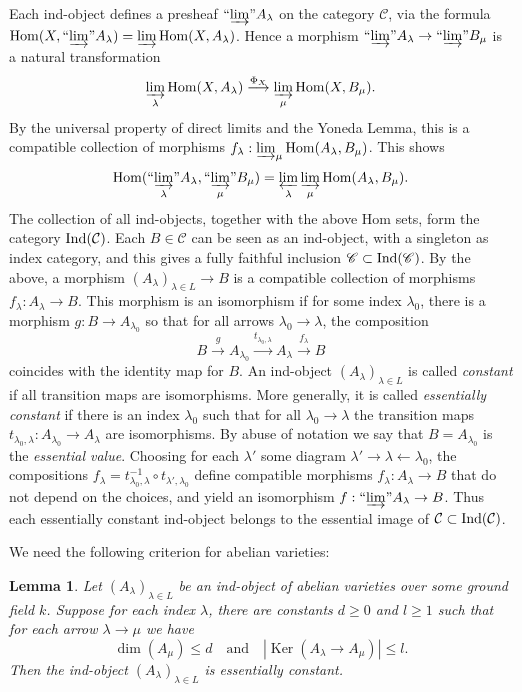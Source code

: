 \documentclass[oneside, 12pt]{amsart}
\newcommand\mylabel[1]{\label{#1}\marginpar{\vspace{-1ex}\medskip\medskip\footnotesize \tt #1}}
\renewcommand\mylabel[1]{\label{#1}}
\newtheorem{lemma}[theorem]{Lemma}
\theoremstyle{definition}
\theoremstyle{remark}
\newcommand{\shC}{\mathscr{C}}
\newcommand{\catC}{\mathcal{C}}
\newcommand{\Hom}{\operatorname{Hom}}
\newcommand{\Kernel}{\operatorname{Ker}}
\newcommand{\dirlim}{\varinjlim}
\newcommand{\invlim}{\varprojlim}
\newcommand{\lra}{\longrightarrow}
\newcommand{\quadand}{\quad\text{and}\quad}
\newcommand{\ra}{\rightarrow}
\begin{document}
Each   ind-object defines a presheaf $``\!\dirlim\!"A_\lambda$ on the category  $\catC$, via the formula
$\Hom(X,``\!\dirlim\!"A_\lambda)=\dirlim\Hom(X,A_\lambda)$. Hence a morphism $``\!\dirlim\!"A_\lambda \ra ``\!\dirlim\!"B_\mu$
is a natural transformation
$$
\dirlim_\lambda\Hom(X,A_\lambda) \stackrel{\Phi_X}{\lra}  \dirlim_\mu\Hom(X,B_\mu).
$$
By the universal property of direct limits and the Yoneda Lemma, this is a compatible collection of morphisms 
$f_\lambda:\dirlim_\mu\Hom(A_\lambda,B_\mu)$. This shows 
\begin{equation}
\label{homs  ind objects}
\Hom( ``\!\dirlim_\lambda\!"A_\lambda, ``\!\dirlim_\mu\!"B_\mu)=\invlim_\lambda\dirlim_\mu \Hom(A_\lambda,B_\mu).
\end{equation}
The collection of all ind-objects, together with the above Hom sets, form the  category  $\Ind(\catC)$.
Each   $B\in \catC$ can be seen as an ind-object, with a singleton as index category, and this gives 
a fully faithful inclusion $\shC\subset\Ind(\shC)$.
By the above, a  morphism $(A_\lambda)_{\lambda\in L}\ra B$  is a compatible collection of morphisms $f_\lambda:A_\lambda\ra B$.
This morphism is an isomorphism if for some index $\lambda_0$,
there is a morphism $g:B\ra A_{\lambda_0}$ so that for all arrows $\lambda_0\ra\lambda$,
the composition
$$
B\stackrel{g}{\lra} A_{\lambda_0}\stackrel{t_{\lambda_0,\lambda}}{\lra} A_\lambda\stackrel{f_\lambda}{\lra} B
$$ 
coincides with the identity map for $B$. An ind-object $(A_\lambda)_{\lambda\in L}$ is called \emph{constant } if all transition
maps are isomorphisms.
More generally, it is called   \emph{essentially constant} if there is an index $\lambda_0$
such that for all   $\lambda_0\ra \lambda$ the transition maps $t_{\lambda_0,\lambda}:A_{\lambda_0}\ra A_\lambda$ are isomorphisms.
By abuse of notation we say that   $B=A_{\lambda_0}$ is the \emph{essential value}. Choosing for each $\lambda'$ some diagram $\lambda'\ra \lambda\leftarrow \lambda_0$,
the compositions $f_\lambda=t_{\lambda_0,\lambda}^{-1}\circ t_{\lambda',\lambda_0}$ define compatible morphisms
$f_\lambda:A_\lambda\ra B$ that    do not depend on  the choices,
and yield an isomorphism $f:``\!\dirlim\!"A_\lambda\ra B$. Thus each essentially constant ind-object
belongs to the essential image of   $\catC\subset\Ind(\catC)$.

We need the following criterion for abelian varieties: 

\begin{lemma}
\mylabel{essentially constant}
Let $(A_\lambda)_{\lambda\in L}$ be an ind-object of abelian varieties over some ground field $k$.
Suppose for each index $\lambda$, there are constants $d\geq 0$ and $l\geq 1$ such that for each arrow $\lambda\ra \mu$
we have
$$
\dim(A_\mu)\leq d\quadand |\Kernel(A_{\lambda}\ra A_\mu)|\leq l.
$$
Then the ind-object $(A_\lambda)_{\lambda\in L}$ is essentially constant.
\end{lemma}
\end{document}
